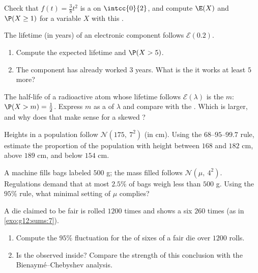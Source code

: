 \begin{exercise}[$\star$]\label{exo:g12:contdist:2}
Check that $f(t) = \frac{3}{8}t^2$ is a  on $\intcc{0}{2}$, and
compute $\E(X)$ and $\P(X \geq 1)$ for a variable $X$ with this .
\end{exercise}

\begin{exercise}[$\star$]\label{exo:g12:contdist:3}
The lifetime (in years) of an electronic component follows
$\mathcal E(0.2)$.
\begin{enumerate}
  \item Compute the expected lifetime and $\P(X > 5)$.
  \item The component has already worked $3$ years. What is the
         it works at least $5$ more?
\end{enumerate}
\end{exercise}

\begin{exercise}[$\star\star$]\label{exo:g12:contdist:4}
The half-life of a radioactive atom whose lifetime follows
$\mathcal E(\lambda)$ is the  $m$: $\P(X > m) = \frac12$. Express
$m$ as a  of $\lambda$ and compare with the . Which is
larger, and why does that make sense for a skewed ?
\end{exercise}

\begin{exercise}[$\star\star$]\label{exo:g12:contdist:5}
Heights in a population follow $\mathcal N(175,\ 7^2)$ (in cm). Using the
$68$--$95$--$99.7$ rule, estimate the proportion of the population with
height between $168$ and $182$ cm, above $189$ cm, and below $154$ cm.
\end{exercise}

\begin{exercise}[$\star\star$]\label{exo:g12:contdist:6}
A machine fills bags labeled $500$ g; the mass filled follows
$\mathcal N(\mu,\ 4^2)$. Regulations demand that at most $2.5\%$ of bags
weigh less than $500$ g. Using the $95\%$ rule, what minimal setting of
$\mu$ complies?
\end{exercise}

\begin{exercise}[$\star\star$]\label{exo:g12:contdist:7}
A die claimed to be fair is rolled $1200$ times and shows a six $260$
times (as in \cref{exo:g12:sums:7}).
\begin{enumerate}
  \item Compute the $95\%$ fluctuation  for the  of sixes
        of a fair die over $1200$ rolls.
  \item Is the observed  inside? Compare the strength of this
        conclusion with the Bienaymé--Chebyshev analysis.
\end{enumerate}
\end{exercise}

